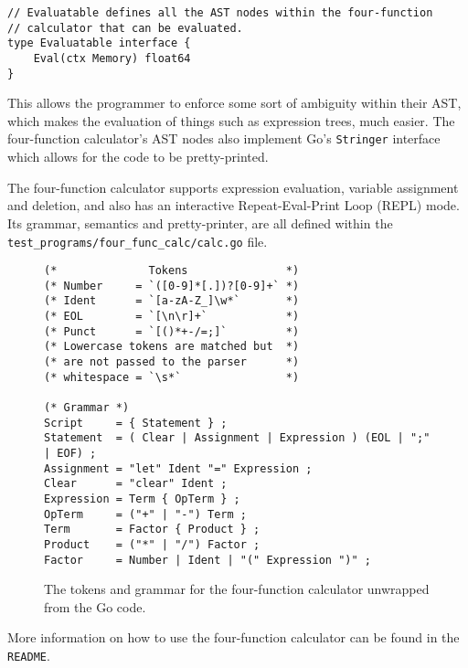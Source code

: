 \begin{verbatim}
// Evaluatable defines all the AST nodes within the four-function 
// calculator that can be evaluated.
type Evaluatable interface {
    Eval(ctx Memory) float64
}
\end{verbatim}

This allows the programmer to enforce some sort of ambiguity within their AST, which makes the evaluation of things such as expression trees, much easier. The four-function calculator's AST nodes also implement Go's \verb|Stringer| interface which allows for the code to be pretty-printed.

The four-function calculator supports expression evaluation, variable assignment and deletion, and also has an interactive Repeat-Eval-Print Loop (REPL) mode. Its grammar, semantics and pretty-printer, are all defined within the \verb|test_programs/four_func_calc/calc.go| file.

\begin{figure}[H]
    \begin{verbatim}
(*              Tokens               *)
(* Number     = `([0-9]*[.])?[0-9]+` *)
(* Ident      = `[a-zA-Z_]\w*`       *)
(* EOL        = `[\n\r]+`            *)
(* Punct      = `[()*+-/=;]`         *)
(* Lowercase tokens are matched but  *)
(* are not passed to the parser      *)
(* whitespace = `\s*`                *)

(* Grammar *)
Script     = { Statement } ;
Statement  = ( Clear | Assignment | Expression ) (EOL | ";" | EOF) ;
Assignment = "let" Ident "=" Expression ;
Clear      = "clear" Ident ;
Expression = Term { OpTerm } ;
OpTerm     = ("+" | "-") Term ;
Term       = Factor { Product } ;
Product    = ("*" | "/") Factor ;
Factor     = Number | Ident | "(" Expression ")" ;
    \end{verbatim}
    \cprotect\caption{The tokens and grammar for the four-function calculator unwrapped from the Go code.}
\end{figure}

More information on how to use the four-function calculator can be found in the \verb|README|.
